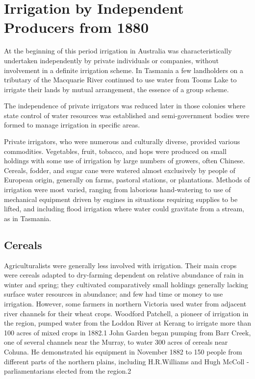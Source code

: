  
\chapter{Irrigation by Independent Producers from 1880}

At the beginning of this period irrigation in Australia was
characteristically undertaken independently by private individuals or
companies, without involvement in a definite irrigation scheme. In
Tasmania a few landholders on a tributary of the Macquarie River
continued to use water from Tooms Lake to irrigate their lands by
mutual arrangement, the essence of a group scheme.

The independence of private irrigators was reduced later in those
colonies where state control of water resources was established and
semi-government bodies were formed to manage irrigation in specific
areas.

Private irrigators, who were numerous and culturally diverse, provided
various commodities. Vegetables, fruit, tobacco, and hops were
produced on small holdings with some use of irrigation by large
numbers of growers, often Chinese. Cereals, fodder, and sugar cane
were watered almost exclusively by people of European origin,
generally on farms, pastoral stations, or plantations. Methods of
irrigation were most varied, ranging from laborious hand-watering to
use of mechanical equipment driven by engines in situations requiring
supplies to be lifted, and including flood irrigation where water
could gravitate from a stream, as in Tasmania.

\section{Cereals}

Agriculturalists were generally less involved with irrigation. Their
main crops were cereals adapted to dry-farming dependent on relative
abundance of rain in winter and spring; they cultivated comparatively
small holdings generally lacking surface water resources in abundance;
and few had time or money to use irrigation. However, some farmers in
northern Victoria used water from adjacent river channels for their
wheat crops. Woodford Patchell, a pioneer of irrigation in the region,
pumped water from the Loddon River at Kerang to irrigate more than 100
acres of mixed crops in 1882.1 John Garden began pumping from Barr
Creek, one of several channels near the Murray, to water 300 acres of
cereals near Cohuna. He demonstrated his equipment in November 1882 to
150 people from different parts of the northern plains, including
H.R.Williams and Hugh McColl - parliamentarians elected from the
region.2

